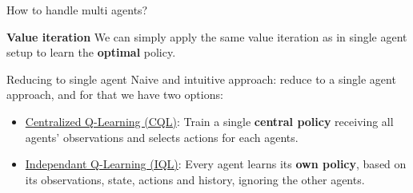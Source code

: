 \documentclass[aspectratio=169,xcolor=dvipsnames]{beamer}
\begin{document}
\begin{frame}{How to handle multi agents?}

\begin{block}{\textbf{Value iteration}}
    We can simply apply the same value iteration as in single agent setup to learn the \textbf{optimal} policy.
\end{block}

\begin{block}{Reducing to single agent}
   Naive and intuitive approach: reduce to a single agent approach, and for that we have two options: 

   \begin{itemize}
       \item \underline{Centralized Q-Learning (CQL)}: Train a single \textbf{central policy} receiving all agents’ observations and selects actions for each agents.
       \item \underline{Independant Q-Learning (IQL)}: Every agent learns its \textbf{own policy}, based on its observations, state, actions and history, ignoring the other agents.
   \end{itemize}
\end{block}

\end{frame}

\end{document}
